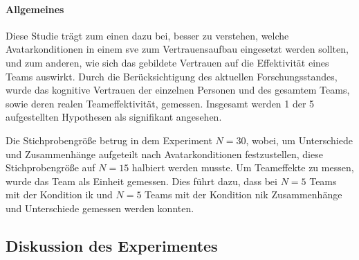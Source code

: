\documentclass[a4paper,11pt]{article}%
\renewcommand{\\}{\vspace*{0.5\baselineskip} \newline}
\begin{document}
\paragraph{Allgemeines}
	Diese Studie trägt zum einen dazu bei, besser zu verstehen, welche Avatarkonditionen in einem \ac{sve} zum Vertrauensaufbau eingesetzt werden sollten, und zum anderen, wie sich das gebildete Vertrauen auf die Effektivität eines Teams auswirkt. Durch die Berücksichtigung des aktuellen Forschungsstandes, wurde das kognitive Vertrauen der einzelnen Personen und des gesamtem Teams, sowie deren realen Teameffektivität, gemessen. Insgesamt werden 1 der 5 aufgestellten Hypothesen als signifikant angesehen.

Die Stichprobengröße betrug in dem Experiment $N=30$, wobei, um Unterschiede und Zusammenhänge aufgeteilt nach Avatarkonditionen festzustellen, diese Stichprobengröße auf $N=15$ halbiert werden musste. Um Teameffekte zu messen, wurde das Team als Einheit gemessen. Dies führt dazu, dass bei $N=5$ Teams mit der Kondition \ac{ik} und $N=5$ Teams mit der Kondition \ac{nik} Zusammenhänge und Unterschiede gemessen werden konnten.





%


\subsection{Diskussion des Experimentes}
\end{document}
